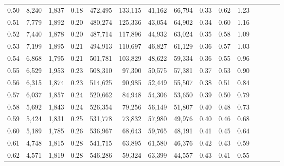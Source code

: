 \begin{tabular}{rrrcrrrrrrrrrrr}
0.50 &   8,240 &  1,837 &                                       0.18 &  472,495 &  133,115 &   41,162 &   66,794 &  0.33 &  0.62 &                         1.23 \\
0.51 &   7,779 &  1,892 &                                       0.20 &  480,274 &  125,336 &   43,054 &   64,902 &  0.34 &  0.60 &                         1.16 \\
0.52 &   7,440 &  1,878 &                                       0.20 &  487,714 &  117,896 &   44,932 &   63,024 &  0.35 &  0.58 &                         1.09 \\
0.53 &   7,199 &  1,895 &                                       0.21 &  494,913 &  110,697 &   46,827 &   61,129 &  0.36 &  0.57 &                         1.03 \\
0.54 &   6,868 &  1,795 &                                       0.21 &  501,781 &  103,829 &   48,622 &   59,334 &  0.36 &  0.55 &                         0.96 \\
0.55 &   6,529 &  1,953 &                                       0.23 &  508,310 &   97,300 &   50,575 &   57,381 &  0.37 &  0.53 &                         0.90 \\
0.56 &   6,315 &  1,874 &                                       0.23 &  514,625 &   90,985 &   52,449 &   55,507 &  0.38 &  0.51 &                         0.84 \\
0.57 &   6,037 &  1,857 &                                       0.24 &  520,662 &   84,948 &   54,306 &   53,650 &  0.39 &  0.50 &                         0.79 \\
0.58 &   5,692 &  1,843 &                                       0.24 &  526,354 &   79,256 &   56,149 &   51,807 &  0.40 &  0.48 &                         0.73 \\
0.59 &   5,424 &  1,831 &                                       0.25 &  531,778 &   73,832 &   57,980 &   49,976 &  0.40 &  0.46 &                         0.68 \\
0.60 &   5,189 &  1,785 &                                       0.26 &  536,967 &   68,643 &   59,765 &   48,191 &  0.41 &  0.45 &                         0.64 \\
0.61 &   4,748 &  1,815 &                                       0.28 &  541,715 &   63,895 &   61,580 &   46,376 &  0.42 &  0.43 &                         0.59 \\
0.62 &   4,571 &  1,819 &                                       0.28 &  546,286 &   59,324 &   63,399 &   44,557 &  0.43 &  0.41 &                         0.55 \\

\end{tabular}

